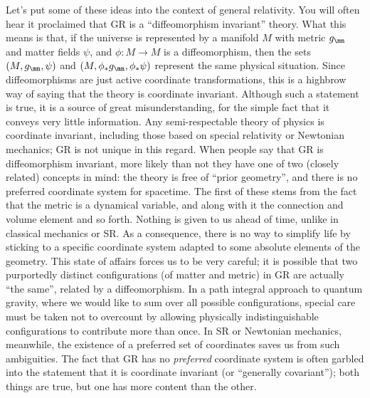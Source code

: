 \documentclass[12pt]{article}
\begin{document}
Let's put some of these ideas into the context of general relativity.
You will often hear it proclaimed that GR is a ``diffeomorphism
invariant'' theory.  What this means is that, if the universe is 
represented by a manifold $M$ with metric $g_\mn$ and matter fields
$\psi$, and $\phi:M\rightarrow M$ is a diffeomorphism, then the sets 
$(M,g_\mn,\psi)$ and $(M, \phi_*g_\mn,\phi_*\psi)$ represent the same
physical situation.  Since diffeomorphisms are just active coordinate
transformations, this is a highbrow way of saying that the theory is
coordinate invariant.  Although such a statement is true, it is a 
source of great misunderstanding, for the simple fact that it conveys
very little information.  Any semi-respectable theory of physics is
coordinate invariant, including those based on special relativity or
Newtonian mechanics; GR is not unique in this regard.  When people say 
that GR is diffeomorphism invariant, more likely than not they have one 
of two (closely related) concepts in mind: the theory is free of ``prior 
geometry'', and there is no preferred coordinate system for spacetime.
The first of these stems from the fact that the metric is a 
dynamical variable, and along with it the connection and volume
element and so forth.  Nothing is given to us ahead of time, unlike in
classical mechanics or SR.  As a consequence, there is no way to
simplify life by sticking to a specific coordinate system adapted to
some absolute elements of the geometry.  This state of affairs forces
us to be very careful; it is possible that two purportedly distinct
configurations (of matter and metric) in GR are actually ``the same'',
related by a diffeomorphism.  In a path integral approach to quantum
gravity, where we would like to sum over all possible configurations,
special care must be taken not to overcount by allowing physically
indistinguishable configurations to contribute more than once.  In
SR or Newtonian mechanics, meanwhile, the existence of a preferred 
set of coordinates saves us from such ambiguities.  The fact that GR
has no {\it preferred} coordinate system is often garbled into the
statement that it is coordinate invariant (or ``generally covariant'');
both things are true, but one has more content than the other.
\end{document}
